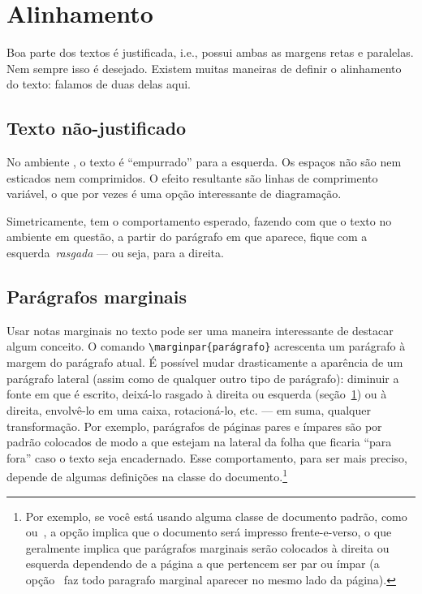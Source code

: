 \section{Alinhamento}\label{sec:alinhamento}

Boa parte dos textos é justificada, i.e., possui ambas as margens
retas e paralelas. Nem sempre isso é desejado. Existem muitas maneiras
de definir o alinhamento do texto: falamos de duas delas aqui.

\subsection{Texto não-justificado}

\begin{flushleft}
No ambiente
, o texto é
``empurrado'' para a esquerda. Os espaços não são nem esticados nem
comprimidos. O efeito resultante são linhas de comprimento variável, o
que por vezes é uma opção interessante de diagramação.
\end{flushleft}

\begin{flushright}
Simetricamente,
 tem o
comportamento esperado, fazendo com que o texto no ambiente em
questão, a partir do parágrafo em que aparece, fique com a
esquerda~\emph{rasgada} --- ou seja, para a direita.
\end{flushright}

\subsection{Parágrafos marginais}

Usar  notas
marginais no texto pode ser uma maneira interessante de destacar algum
conceito. O comando \verb'\marginpar{parágrafo}' acrescenta um
parágrafo à margem do parágrafo atual. É possível mudar drasticamente
a aparência de um parágrafo lateral (assim como de qualquer outro tipo
de parágrafo): diminuir a fonte em que é escrito, deixá-lo rasgado à
direita ou esquerda (seção~\ref{sec:alinhamento}) ou à direita,
envolvê-lo em uma caixa,
rotacioná-lo, etc. ---
em suma, qualquer transformação. Por exemplo, parágrafos de páginas
pares e ímpares são por padrão colocados de modo a que estejam na
lateral da folha que ficaria ``para fora'' caso o texto seja
encadernado. Esse comportamento, para ser mais preciso, depende de
algumas definições na classe do documento.\footnote{Por exemplo, se
  você está usando alguma  classe de documento padrão,
  como~ ou~, a opção
   implica que o documento será impresso
  frente-e-verso, o que geralmente implica que parágrafos marginais
  serão colocados à direita ou esquerda dependendo de a página a que
  pertencem ser par ou ímpar (a opção~ faz todo
  paragrafo marginal aparecer no mesmo lado da página).}
